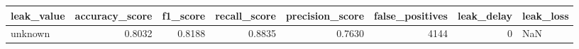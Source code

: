 \begin{tabular}{lrrrrrrl}
\toprule
leak\_value & accuracy\_score & f1\_score & recall\_score & precision\_score & false\_positives & leak\_delay & leak\_loss \\
\midrule
unknown & 0.8032 & 0.8188 & 0.8835 & 0.7630 & 4144 & 0 & NaN \\
\bottomrule
\end{tabular}
